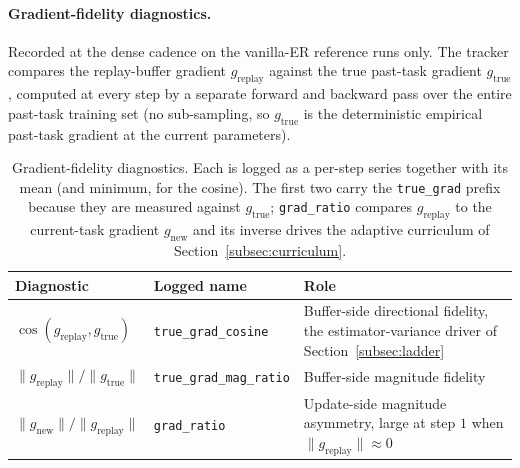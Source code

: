 \paragraph{Gradient-fidelity diagnostics.}
\label{subsubsec:grad_metrics}
Recorded at the dense cadence on the vanilla-ER reference runs only. The tracker compares the replay-buffer gradient $g_{\text{replay}}$ against the true past-task gradient $g_{\text{true}}$, computed at every step by a separate forward and backward pass over the entire past-task training set (no sub-sampling, so $g_{\text{true}}$ is the deterministic empirical past-task gradient at the current parameters).

\begin{table}[H]
    \centering
    \small
    \begin{tabular}{@{}p{4.2cm} p{3.0cm} p{7.2cm}@{}}
        \hline
        Diagnostic                                    & Logged name                     & Role                                                                                            \\
        \hline
        $\cos(g_{\text{replay}}, g_{\text{true}})$    & \texttt{true\_grad\_cosine}     & Buffer-side directional fidelity, the estimator-variance driver of Section~\ref{subsec:ladder} \\
        $\|g_{\text{replay}}\| / \|g_{\text{true}}\|$ & \texttt{true\_grad\_mag\_ratio} & Buffer-side magnitude fidelity                                                                  \\
        $\|g_{\text{new}}\| / \|g_{\text{replay}}\|$  & \texttt{grad\_ratio}            & Update-side magnitude asymmetry, large at step $1$ when $\|g_{\text{replay}}\| \approx 0$       \\
        \hline
    \end{tabular}
    \caption{Gradient-fidelity diagnostics. Each is logged as a per-step series together with its mean (and minimum, for the cosine). The first two carry the \texttt{true\_grad} prefix because they are measured against $g_{\text{true}}$; \texttt{grad\_ratio} compares $g_{\text{replay}}$ to the current-task gradient $g_{\text{new}}$ and its inverse drives the adaptive curriculum of Section~\ref{subsec:curriculum}.}
    \label{tab:grad_metrics}
\end{table}
